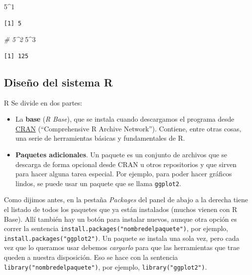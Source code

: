 \documentclass[
]{book}
\newenvironment{Shaded}{\begin{snugshade}}{\end{snugshade}}
\newcommand{\CommentTok}[1]{\textcolor[rgb]{0.56,0.35,0.01}{\textit{#1}}}
\newcommand{\DecValTok}[1]{\textcolor[rgb]{0.00,0.00,0.81}{#1}}
\newcommand{\SpecialCharTok}[1]{\textcolor[rgb]{0.00,0.00,0.00}{#1}}
\begin{document}
\begin{Shaded}
\begin{Highlighting}[]
\DecValTok{5}\SpecialCharTok{\^{}}\DecValTok{1}
\end{Highlighting}
\end{Shaded}

\begin{verbatim}
[1] 5
\end{verbatim}

\begin{Shaded}
\begin{Highlighting}[]
\CommentTok{\# 5\^{}2}
\DecValTok{5}\SpecialCharTok{\^{}}\DecValTok{3}
\end{Highlighting}
\end{Shaded}

\begin{verbatim}
[1] 125
\end{verbatim}

\hypertarget{diseuxf1o-del-sistema-r}{%
\subsection{Diseño del sistema R}\label{diseuxf1o-del-sistema-r}}

R Se divide en dos partes:

\begin{itemize}
\item
  La \textbf{base} (\emph{R Base}), que se instala cuando descargamos el programa desde \href{https://cran.r-project.org/}{CRAN} (``Comprehensive R Archive Network''). Contiene, entre otras cosas, una serie de herramientas básicas y fundamentales de R.
\item
  \textbf{Paquetes adicionales}. Un paquete es un conjunto de archivos que se descarga de forma opcional desde CRAN u otros repositorios y que sirven para hacer alguna tarea especial. Por ejemplo, para poder hacer gráficos lindos, se puede usar un paquete que se llama \texttt{ggplot2}.
\end{itemize}

Como dijimos antes, en la pestaña \emph{Packages} del panel de abajo a la derecha tiene el listado de todos los paquetes que ya están instalados (muchos vienen con R Base). Allí también hay un botón para instalar nuevos, aunque otra opción es correr la sentencia \texttt{install.packages("nombredelpaquete")}, por ejemplo, \texttt{install.packages("ggplot2")}. Un paquete se instala una sola vez, pero cada vez que lo queramos usar debemos \emph{cargarlo} para que las herramientas que trae queden a nuestra disposición. Eso se hace con la sentencia \texttt{library("nombredelpaquete")}, por ejemplo, \texttt{library("ggplot2")}.
\end{document}
